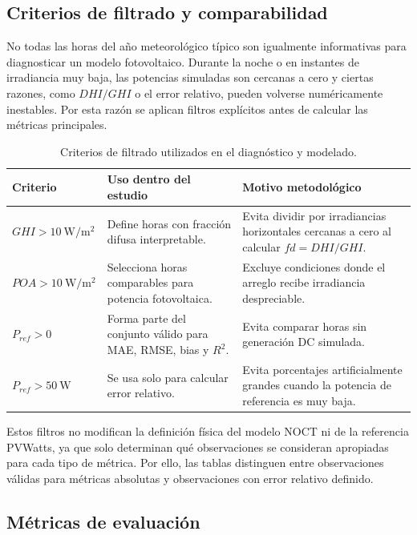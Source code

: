 \documentclass[12pt, letterpaper]{article}
\begin{document}
\subsection{Criterios de filtrado y comparabilidad}

No todas las horas del a\~no meteorol\'ogico t\'ipico son igualmente informativas para diagnosticar un modelo fotovoltaico. Durante la noche o en instantes de irradiancia muy baja, las potencias simuladas son cercanas a cero y ciertas razones, como \(DHI/GHI\) o el error relativo, pueden volverse num\'ericamente inestables. Por esta raz\'on se aplican filtros expl\'icitos antes de calcular las m\'etricas principales.

\begin{table}[H]
\centering
\caption{Criterios de filtrado utilizados en el diagn\'ostico y modelado.}
\label{tab:filtros_modelado}
\small
\begin{tabularx}{\textwidth}{lXX}
\toprule
\textbf{Criterio} & \textbf{Uso dentro del estudio} & \textbf{Motivo metodol\'ogico} \\
\midrule
\(GHI > \SI{10}{\watt\per\square\meter}\) & Define horas con fracci\'on difusa interpretable. & Evita dividir por irradiancias horizontales cercanas a cero al calcular \(fd=DHI/GHI\). \\
\(POA > \SI{10}{\watt\per\square\meter}\) & Selecciona horas comparables para potencia fotovoltaica. & Excluye condiciones donde el arreglo recibe irradiancia despreciable. \\
\(P_{ref} > 0\) & Forma parte del conjunto v\'alido para MAE, RMSE, bias y \(R^2\). & Evita comparar horas sin generaci\'on DC simulada. \\
\(P_{ref} > \SI{50}{\watt}\) & Se usa solo para calcular error relativo. & Evita porcentajes artificialmente grandes cuando la potencia de referencia es muy baja. \\
\bottomrule
\end{tabularx}
\end{table}

Estos filtros no modifican la definici\'on f\'isica del modelo NOCT ni de la referencia PVWatts, ya que solo determinan qu\'e observaciones se consideran apropiadas para cada tipo de m\'etrica. Por ello, las tablas distinguen entre observaciones v\'alidas para m\'etricas absolutas y observaciones con error relativo definido.

\subsection{M\'etricas de evaluaci\'on}
\end{document}

